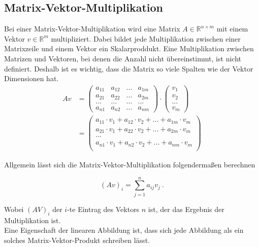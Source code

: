 \subsection{Matrix-Vektor-Multiplikation}
Bei einer Matrix-Vektor-Multiplikation wird eine Matrix $A \in  \mathbb{R}^{n \times m}$ mit einem Vektor $v \in \mathbb{R}^m$ multipliziert. Dabei bildet jede Multiplikation zwischen einer Matrixzeile und einem Vektor ein Skalarproddukt. Eine Multiplikation zwischen Matrizen und Vektoren, bei denen die Anzahl nicht übereinstimmt, ist nicht definiert. Deshalb ist es wichtig, dass die Matrix so viele Spalten wie der Vektor Dimensionen hat.
\begin{align*}
	Av &= 
	\left(
   \begin{array}{cccc}
	  a_{11} & a_{12} & ... & a_{1m}\\
		a_{21} & a_{22} & ... & a_{2m}\\
		...   & ...   & ... & ...  \\
		a_{n1} & a_{n2} & ... & a_{nm}
	 \end{array}
	\right) 
	\cdot 
	\left(
	 \begin{array}{c}
	  v_1\\
		v_2\\
		...\\
		v_m
	 \end{array}
	\right)\\
	&= \left(
	 \begin{array}{c}
	 a_{11} \cdot v_1 + a_{12} \cdot v_2 + ... + a_{1m} \cdot v_m\\
	 a_{21} \cdot v_1 + a_{22} \cdot v_2 + ... + a_{2m} \cdot v_m\\
		...\\
	 a_{n1} \cdot v_1 + a_{n2} \cdot v_2 + ... + a_{nm} \cdot v_m\\
	 \end{array}
	\right)
\end{align*}

Allgemein lässt sich die Matrix-Vektor-Multiplikation folgendermaßen berechnen

\begin{equation*}
(Av)_i = \sum_{j=1}^{n}a_{ij}v_j \ .
\end{equation*}

Wobei $(AV)_i$ der $i$-te Eintrag des Vektors $n$ ist, der das Ergebnis der Multiplikation ist.\\
Eine Eigenschaft der linearen Abbildung ist, dass sich jede Abbildung als ein solches Matrix-Vektor-Produkt schreiben lässt. 

